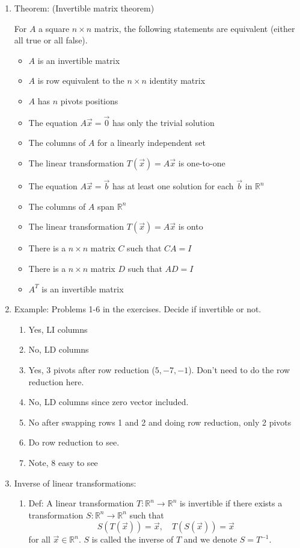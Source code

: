 \documentclass{article}
\begin{document}
\begin{enumerate}

\item Theorem: (Invertible matrix theorem)

For $A$ a square $n \times n$ matrix, the following statements are equivalent (either all true or all false).
\begin{itemize}
\item $A$ is an invertible matrix
\item $A$ is row equivalent to the $n \times n$ identity matrix
\item $A$ has $n$ pivots positions
\item The equation $A\vec{x}=\vec{0}$ has only the trivial solution
\item The columns of $A$ for a linearly independent set
\item The linear transformation $T(\vec{x})=A\vec{x}$ is one-to-one
\item The equation $A\vec{x}=\vec{b}$ has at least one solution for each $\vec{b}$ in $\mathbb{R}^n$
\item The columns of $A$ span $\mathbb{R}^n$
\item The linear transformation $T(\vec{x})=A\vec{x}$ is onto
\item There is a $n \times n$ matrix $C$ such that $CA=I$
\item There is a $n \times n$ matrix $D$ such that $AD=I$
\item $A^T$ is an invertible matrix
\end{itemize}

\item Example: Problems 1-6 in the exercises. Decide if invertible or not.
\begin{enumerate}
\item Yes, LI columns
\item No, LD columns
\item Yes, 3 pivots after row reduction ($5, -7, -1$). Don't need to do the row reduction here.
\item  No, LD columns since zero vector included.
\item No after swapping rows 1 and 2 and doing row reduction, only 2 pivots
\item Do row reduction to see.
\item Note, 8 easy to see
\end{enumerate}

\item Inverse of linear transformations:
\begin{enumerate}
\item Def: A linear transformation $T:\mathbb{R}^n \rightarrow \mathbb{R}^n$ is invertible if there exists a transformation $S: \mathbb{R}^n \rightarrow \mathbb{R}^n$ such that
\[
S(T(\vec{x})) = \vec{x}, \quad
T(S(\vec{x})) = \vec{x}
\]
for all $\vec{x} \in \mathbb{R}^n$. $S$ is called the inverse of $T$ and we denote $S=T^{-1}$.


\end{enumerate}
\end{enumerate}
\end{document}

